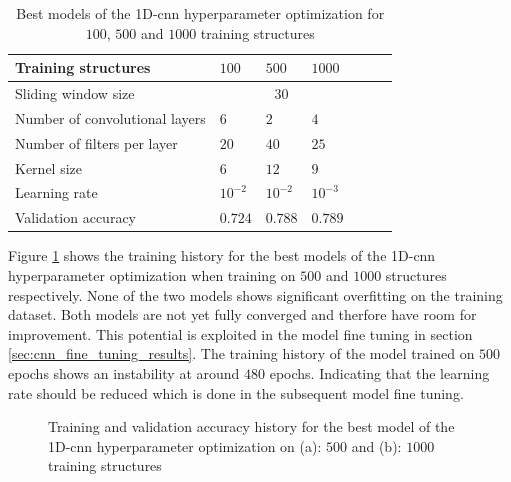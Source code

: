 \documentclass[conference]{IEEEtran}
\begin{document}
\begin{table}[htp]
	\centering
	\caption{Best models of the 1D-\gls{cnn} hyperparameter optimization for $ 100 $, $ 500 $ and $ 1000 $ training structures}
	\label{tab:hyperparameters_100_500_1000_structures_CNN}
	\begin{tabular}{p{2.5cm}|llllll}
		Training structures & $ 100 $ & $ 500 $ & $ 1000 $ \\
		\hline
		Sliding window size & \multicolumn{3}{c}{$ 30 $} \\
		\hline
		Number of convolutional layers & $ 6 $ & $ 2 $ & $ 4 $ \\
		Number of filters per layer & $ 20 $ & $ 40 $ & $ 25 $ \\
		Kernel size & $ 6 $ & $ 12 $ & $ 9 $ \\
		Learning rate & $ 10^{-2} $ & $ 10^{-2} $ & $ 10^{-3} $ \\
		\hline
		Validation accuracy & $ 0.724 $ & $ 0.788 $ & $ 0.789 $
	\end{tabular}
\end{table}

Figure \ref{fig:accuracy_500_1000_structures_random_search_CNN} shows the training history for the best models of the 1D-\gls{cnn} hyperparameter optimization when training on $ 500 $ and $ 1000 $ structures respectively. None of the two models shows significant overfitting on the training dataset. Both models are not yet fully converged and therfore have room for improvement. This potential is exploited in the model fine tuning in section \ref{sec:cnn_fine_tuning_results}. The training history of the model trained on $ 500 $ epochs shows an instability at around $ 480 $ epochs. Indicating that the learning rate should be reduced which is done in the subsequent model fine tuning.

\begin{figure}[htp]
	\centering
	\quad
	\caption{Training and validation accuracy history for the best model of the 1D-\gls{cnn} hyperparameter optimization on (a): $ 500 $ and (b): $ 1000 $ training structures}
	\label{fig:accuracy_500_1000_structures_random_search_CNN}
\end{figure}
\end{document}
